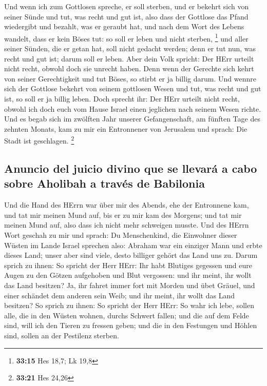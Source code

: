  Und wenn ich zum Gottlosen spreche, er soll sterben, und
er bekehrt sich von seiner Sünde und tut, was recht und gut ist,
 also dass der Gottlose das Pfand wiedergibt und bezahlt,
was er geraubt hat, und nach dem Wort des Lebens wandelt, dass er kein
Böses tut: so soll er leben und nicht sterben, \footnote{\textbf{33:15}
  Hes 18,7; Lk 19,8}  und aller seiner Sünden, die er
getan hat, soll nicht gedacht werden; denn er tut nun, was recht und gut
ist; darum soll er leben.  Aber dein Volk spricht: Der
HErr urteilt nicht recht, obwohl doch sie unrecht haben. 
Denn wenn der Gerechte sich kehrt von seiner Gerechtigkeit und tut
Böses, so stirbt er ja billig darum.  Und wennre sich der
Gottlose bekehrt von seinem gottlosen Wesen und tut, was recht und gut
ist, so soll er ja billig leben.  Doch sprecht ihr: Der
HErr urteilt nicht recht, obwohl ich doch euch vom Hause Israel einen
jeglichen nach seinem Wesen richte.  Und es begab sich im
zwölften Jahr unserer Gefangenschaft, am fünften Tage des zehnten
Monats, kam zu mir ein Entronnener von Jerusalem und sprach: Die Stadt
ist geschlagen. \footnote{\textbf{33:21} Hes 24,26}

\hypertarget{anuncio-del-juicio-divino-que-se-llevaruxe1-a-cabo-sobre-aholibah-a-travuxe9s-de-babilonia}{%
\subsection{Anuncio del juicio divino que se llevará a cabo sobre
Aholibah a través de
Babilonia}\label{anuncio-del-juicio-divino-que-se-llevaruxe1-a-cabo-sobre-aholibah-a-travuxe9s-de-babilonia}}

 Und die Hand des HErrn war über mir des Abends, ehe der
Entronnene kam, und tat mir meinen Mund auf, bis er zu mir kam des
Morgens; und tat mir meinen Mund auf, also dass ich nicht mehr schweigen
musste.  Und des HErrn Wort geschah zu mir und sprach:
 Du Menschenkind, die Einwohner dieser Wüsten im Lande
Israel sprechen also: Abraham war ein einziger Mann und erbte dieses
Land; unser aber sind viele, desto billiger gehört das Land uns zu.
 Darum sprich zu ihnen: So spricht der Herr HErr: Ihr
habt Blutiges gegessen und eure Augen zu den Götzen aufgehoben und Blut
vergossen: und ihr meint, ihr wollt das Land besitzen? 
Ja, ihr fahret immer fort mit Morden und übet Gräuel, und einer schändet
dem anderen sein Weib; und ihr meint, ihr wollt das Land besitzen?
 So sprich zu ihnen: So spricht der Herr HErr: So wahr
ich lebe, sollen alle, die in den Wüsten wohnen, durchs Schwert fallen;
und die auf dem Felde sind, will ich den Tieren zu fressen geben; und
die in den Festungen und Höhlen sind, sollen an der Pestilenz sterben.

